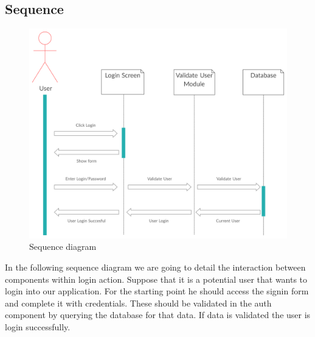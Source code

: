 \subsection{Sequence}
\par
\begin{figure}[h]
	\includegraphics[width=\textwidth]{secuence digrram1}
	\caption{Sequence diagram}	
\end{figure}
\par In the following sequence diagram we are going to detail the interaction between components within login action. Suppose that it is a potential user that wants to login into our application. For the starting point he should access the signin form and complete it with credentials. These should be validated in the auth component by querying the database for that data. If data is validated the user is login successfully.
\par

